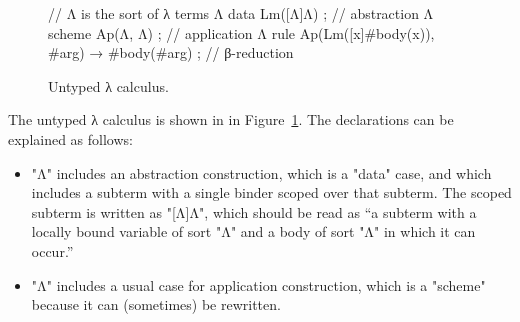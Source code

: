 \documentclass[letterpaper,11pt]{article}
\newcommand{\CK}[1]{\textcolor{blue}{CK: #1}}
\newcommand{\KR}[1]{\textcolor{red}{KR: #1}}
\newcommand{\MS}[1]{\textcolor{violet}{MS: #1}}
\begin{document}
\begin{figure}[h!t]
  \begin{hacs}[numbers=right,texcl]
// Λ is the sort of λ terms
Λ  data Lm([Λ]Λ) ;                                        // abstraction
Λ  scheme Ap(Λ, Λ) ;                                      // application
Λ  rule Ap(Lm([x]#body(x)), #arg) → #body(#arg) ;     // β-reduction
  \end{hacs}
  \vspace*{-1em}
  \caption{Untyped λ calculus.}
  \label{fig:lambda}
  \vspace{1em}
\end{figure}

\begin{example}\label{ex:lambda}
  The untyped λ calculus is shown in \hax in Figure~\ref{fig:lambda}.  The declarations can be
  explained as follows:
  \begin{itemize}


  \item "Λ" includes an abstraction construction, which is a "data" case, and which includes a
    subterm with a single binder scoped over that subterm. The scoped subterm is written as
    "[Λ]Λ", which should be read as ``a subterm with a locally bound variable of sort "Λ" and a
    body of sort "Λ" in which it can occur.''

  \item "Λ" includes a usual case for application construction, which is a "scheme" because it
    can (sometimes) be rewritten.


\end{itemize}
\end{example}
\end{document}
